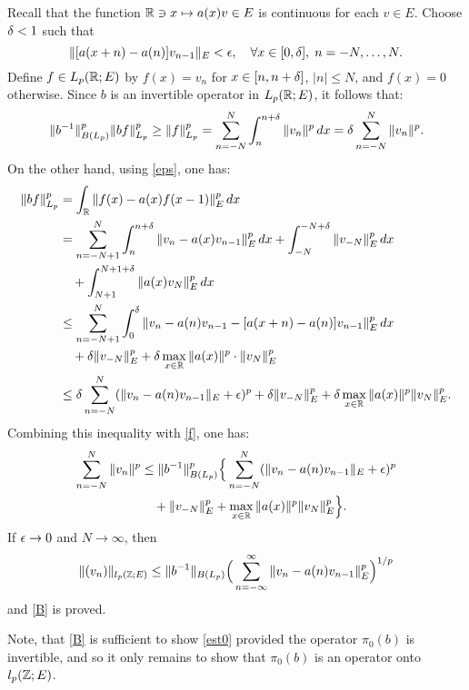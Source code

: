 \begin{pf}
Recall that the function
${\Bbb{R}} \ni x \mapsto a(x) v\in E$ is continuous for each $v\in
E$.  Choose $\delta < 1$ such that
\begin{equation}
\| [a(x+n) -a(n) ] v_{n-1} \|_E < \eps,
\quad \forall x\in [0 , \del],\; n=-N, \ldots, N.
\lb{eps}
\end{equation}
Define $f\in L_p({\Bbb{R}};E)$ by $f(x) =v_n$
for $x\in [n, n+\delta]$,
$|n| \leq N$, and $f(x) =0$ otherwise.  Since $b$ is an
invertible operator in $L_p
({\Bbb{R}};E)$, it follows that:
\begin{equation}
\|b^{-1} \|_{B(L_p)}^p \|bf\|_{L_p}^p \geq \|f\|_{L_p}^p =\sum_{n=-N}^N
\int_{n}^{n+\del} \|v_n\|^p \, dx = \del \sum_{n=-N}^N
\|v_n\|^p.
\lb{f}
\end{equation}
On the other hand, using \eqref{eps}, one has:
\begin{align*}
\|bf\|_{L_p}^p & =\int_{\bbR} \| f(x) -a(x) f(x-1)\|_E^p\, dx\\
&=\sum_{n=-N+1}^N \int_{n}^{n+\del} \|v_n -a(x) v_{n-1} \|_E^p \,
dx +\int_{-N}^{-N+\del} \| v_{-N}\|_E^p \, dx \\
&\quad + \int_{N+1}^{N+1+\del} \|a(x) v_N \|_E^p \, dx\\
& \leq \sum_{n=-N+1}^N \int_{0}^{\del}
\|v_n - a(n) v_{n-1} -[a(x+n)
-a(n)] v_{n-1} \|_E^p\, dx\\
&\quad +\del \|v_{-N}\|_E^p +\del \max_{x\in\bbR} \|a(x) \|^p \cdot
\|v_N\|_E^p\\
& \leq \del \sum_{n=-N}^N (\| v_n -a(n) v_{n-1} \|_E +\eps )^p +\del
\| v_{-N}\|_E^p +\del \max_{x\in\bbR} \|a(x) \|^p \|v_N\|_E^p.
\end{align*}
Combining this inequality with \eqref{f}, one has:
\begin{align*}
\sum_{n=-N}^N \|v_n\|^p & \leq \|b^{-1} \|_{B(L_p)}^p
\Big\{ \sum_{n=-N}^N
(\|v_n -a(n) v_{n-1}\|_E +\eps )^p \\
& \quad + \|v_{-N} \|_E^p +
\max_{x\in\bbR}\|a(x)\|^p \|v_N\|_E^p \Big\}.
\end{align*}
If $\epsilon \to 0$ and $N\to\infty$, then
$$
\|(v_n)\|_{l_p({\Bbb{Z}};E)} \leq \|b^{-1} \|_{B(L_p)} \Big(
\sum_{n=-\infty}^\infty \|v_n-a(n) v_{n-1} \|_E^p \Big)^{1/p}
$$
and \eqref{B} is proved.

Note, that \eqref{B} is sufficient to show \eqref{est0} provided
the operator $\pi_0(b)$ is invertible, and so it only remains
to show that $\pi_0 (b)$ is an operator onto $l_p({\Bbb{Z}};E)$.


\end{pf}
